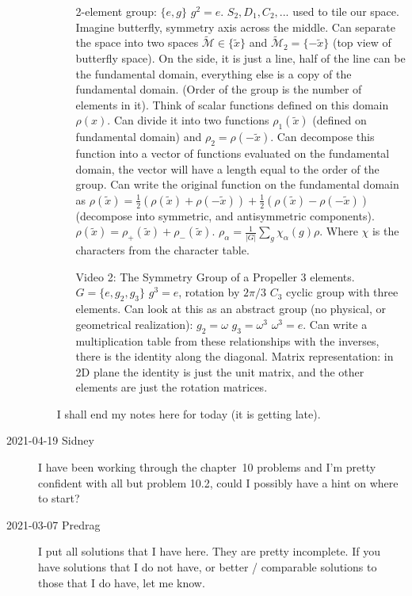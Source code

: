 \begin{description}
\begin{itemize}
\begin{itemize}
2-element group: $\lbrace e,g\rbrace$ $g^2=e$. $S_2,D_1,C_2,...$ used to
tile our space. Imagine butterfly, symmetry axis across the middle. Can
separate the space into two spaces
$\tilde{\mathcal{M}}\in\lbrace\tilde{x}\rbrace$ and
$\tilde{\mathcal{M}}_2=\lbrace -\tilde{x}\rbrace$ (top view of butterfly
space). On the side, it is just a line, half of the line can be the
fundamental domain, everything else is a copy of the fundamental domain.
(Order of the group is the number of elements in it). Think of scalar
functions defined on this domain $\rho(x)$. Can divide it into two
functions $\rho_1(\tilde{x})$ (defined on fundamental domain) and
$\rho_2=\rho(-\tilde{x})$. Can decompose this function into a vector of
functions evaluated on the fundamental domain, the vector will have a
length equal to the order of the group. Can write the original function
on the fundamental domain as
$\rho(\tilde{x})=\frac{1}{2}(\rho(\tilde{x})+\rho(-\tilde{x}))+\frac{1}{2}(\rho(\tilde{x})-\rho(-\tilde{x}))$
(decompose into symmetric, and antisymmetric components).
$\rho(\tilde{x})=\rho_+(\tilde{x})+\rho_-(\tilde{x})$.
$\rho_{\alpha}=\frac{1}{|G|}\sum_g\chi_{\alpha}(g)\rho$. Where $\chi$ is
the characters from the character table.

\item[Video 2: The Symmetry Group of a Propeller]
3 elements. $G=\lbrace e,g_2,g_3\rbrace$ $g^3=e$, rotation by $2\pi/3$
$C_3$ cyclic group with three elements. Can look at this as an abstract
group (no physical, or geometrical realization): $g_2=\omega$
$g_3=\omega^3$ $\omega^3=e$. Can write a multiplication table from these
relationships with the inverses, there is the identity along the
diagonal. Matrix representation: in 2D plane the identity is just the
unit matrix, and the other elements are just the rotation matrices.
    \end{itemize}
I shall end my notes here for today (it is getting late).
\end{itemize}


\item[2021-04-19 Sidney]
I have been working through the chapter~10
 {problems}
and I'm pretty
confident with all but problem 10.2, could I possibly have a hint on
where to start?

\item[2021-03-07 Predrag]
I put all solutions that I have
 {here}.
They are pretty incomplete.
If you have solutions that I do not have, or better / comparable solutions to those that
I do have, let me know.


\end{description}
